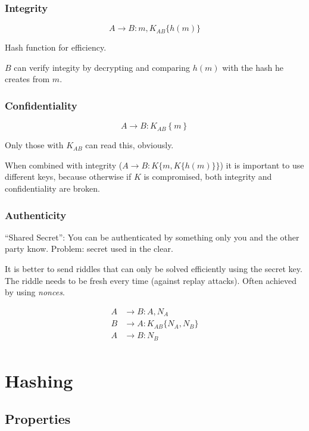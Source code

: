 \documentclass{article}
\begin{document}
\subsubsection{Integrity}

\[
  A \longrightarrow B : m, K_{AB}\{h(m)\}
\]

Hash function for efficiency.

$B$ can verify integity by decrypting and comparing $h(m)$ with the hash he
creates from $m$.

\subsubsection{Confidentiality}

\[ 
  A \longrightarrow B : K_{AB}\left\{ m \right\}
\]

Only those with $K_{AB}$ can read this, obviously.

When combined with integrity ($A \longrightarrow B : K\{m, K\{h(m)\}\}$) it is
important to use different keys, because otherwise if $K$ is compromised, both integrity
and confidentiality are broken.

\subsubsection{Authenticity}

``Shared Secret'': You can be authenticated by something only you and the other
party know. Problem: secret used in the clear.

It is better to send riddles that can only be solved efficiently using the
secret key. The riddle needs to be fresh every time (against replay attacks).
Often achieved by using \emph{nonces}.

\begin{align*}
  A & \longrightarrow  B  : A, N_A             \\
  B & \longrightarrow  A : K_{AB}\{N_A, N_B\} \\
  A & \longrightarrow  B  : N_B                \\
\end{align*}

\section{Hashing}

\subsection{Properties}
\end{document}
